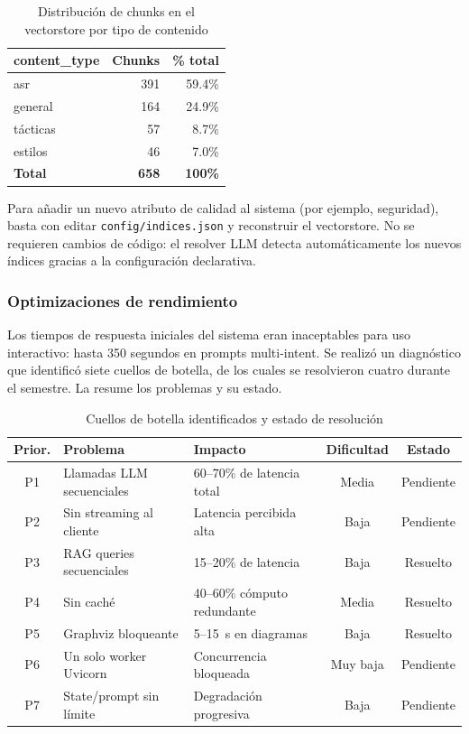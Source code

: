\documentclass[12pt, letterpaper, oneside]{article}
\begin{document}
\begin{table}[H]
\centering
\caption{Distribución de chunks en el vectorstore por tipo de contenido}
\label{tab:distribucion-chunks}
\begin{tabular}{lrr}
\toprule
\textbf{content\_type} & \textbf{Chunks} & \textbf{\% total} \\
\midrule
asr       & 391 & 59.4\% \\
general   & 164 & 24.9\% \\
tácticas  & 57  & 8.7\%  \\
estilos   & 46  & 7.0\%  \\
\midrule
\textbf{Total} & \textbf{658} & \textbf{100\%} \\
\bottomrule
\end{tabular}
\end{table}

Para añadir un nuevo atributo de calidad al sistema (por ejemplo, seguridad),
basta con editar \texttt{config/indices.json} y reconstruir el vectorstore. No se
requieren cambios de código: el resolver LLM detecta automáticamente los nuevos
índices gracias a la configuración declarativa.

\subsubsection{Optimizaciones de rendimiento}
\label{sssec:optimizaciones}

Los tiempos de respuesta iniciales del sistema eran inaceptables para uso
interactivo: hasta 350 segundos en prompts multi-intent. Se realizó un diagnóstico
que identificó siete cuellos de botella, de los cuales se resolvieron cuatro
durante el semestre. La  resume los problemas y su estado.

\begin{table}[H]
\centering
\caption{Cuellos de botella identificados y estado de resolución}
\label{tab:bottlenecks}
\small
\begin{tabularx}{\textwidth}{clXcc}
\toprule
\textbf{Prior.} & \textbf{Problema} & \textbf{Impacto} & \textbf{Dificultad} & \textbf{Estado} \\
\midrule
P1 & Llamadas LLM secuenciales & 60--70\% de latencia total & Media & Pendiente \\
P2 & Sin streaming al cliente & Latencia percibida alta & Baja & Pendiente \\
P3 & RAG queries secuenciales & 15--20\% de latencia & Baja & Resuelto \\
P4 & Sin caché & 40--60\% cómputo redundante & Media & Resuelto \\
P5 & Graphviz bloqueante & 5--15~s en diagramas & Baja & Resuelto \\
P6 & Un solo worker Uvicorn & Concurrencia bloqueada & Muy baja & Pendiente \\
P7 & State/prompt sin límite & Degradación progresiva & Baja & Pendiente \\
\bottomrule
\end{tabularx}
\end{table}
\end{document}
